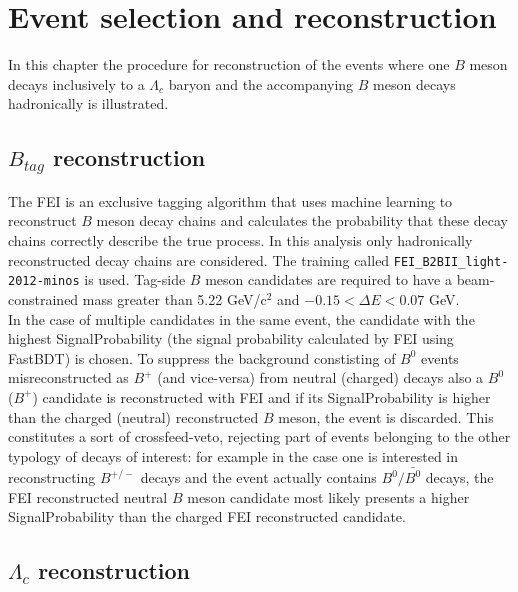 \chapter{Event selection and reconstruction}

In this chapter the procedure for reconstruction of the events where one $B$ meson decays inclusively
to a $\Lambda_c$ baryon and the accompanying $B$ meson decays hadronically is illustrated.

\section{$B_{tag}$ reconstruction}\label{BtagReco}

The FEI is an exclusive tagging algorithm that uses machine learning to reconstruct
$B$ meson decay chains and calculates the probability that these decay chains correctly
describe the true process. In this analysis only hadronically reconstructed decay chains are
considered. The training called \texttt{FEI\_}\texttt{B2BII\_}\texttt{light-2012-minos} is used. Tag-side $B$ meson candidates are required to have a beam-constrained mass greater than 5.22 GeV/c$^2$ and $- 0.15 < \Delta E < 0.07 $   GeV. \\
In the case of multiple candidates in the same event, the candidate with the highest SignalProbability (the signal probability calculated by FEI using FastBDT) is chosen. To suppress the background constisting of $B^0$ events misreconstructed as $B^+$ (and vice-versa) from neutral (charged) decays also a $B^0$ ($B^+$) candidate is reconstructed with FEI and if its SignalProbability is higher than the charged (neutral) reconstructed $B$ meson, the event is discarded. This constitutes a sort of crossfeed-veto, rejecting part of events belonging to the other typology of decays of interest: for example in the case one is interested in reconstructing $B^{+/-}$ decays and the event actually contains $B^0/\bar{B^0}$ decays, the FEI reconstructed neutral $B$ meson candidate most likely presents a higher SignalProbability than the charged FEI reconstructed candidate.

\section{$\Lambda_c$ reconstruction}


